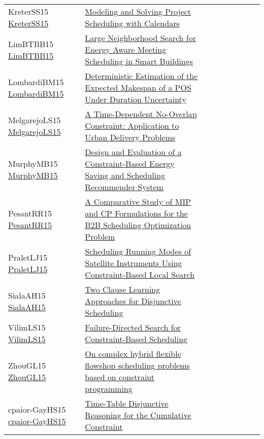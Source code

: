 {\begin{longtable}{p{3cm}p{7cm}lllllll}
KreterSS15 \href{https://doi.org/10.1007/978-3-319-23219-5\_19}{KreterSS15} &  \href{papers/KreterSS15.pdf}{Modeling and Solving Project Scheduling with Calendars} &  &  &  &  &  &  & \\
LimBTBB15 \href{https://doi.org/10.1007/978-3-319-18008-3\_17}{LimBTBB15} &  \href{papers/LimBTBB15.pdf}{Large Neighborhood Search for Energy Aware Meeting Scheduling in Smart Buildings} &  &  &  &  &  &  & \\
LombardiBM15 \href{https://doi.org/10.1007/978-3-319-23219-5\_20}{LombardiBM15} &  \href{papers/LombardiBM15.pdf}{Deterministic Estimation of the Expected Makespan of a {POS} Under Duration Uncertainty} &  &  &  &  &  &  & \\
MelgarejoLS15 \href{https://doi.org/10.1007/978-3-319-18008-3\_1}{MelgarejoLS15} &  \href{papers/MelgarejoLS15.pdf}{A Time-Dependent No-Overlap Constraint: Application to Urban Delivery Problems} &  &  &  &  &  &  & \\
MurphyMB15 \href{https://doi.org/10.1007/978-3-319-23219-5\_47}{MurphyMB15} &  \href{papers/MurphyMB15.pdf}{Design and Evaluation of a Constraint-Based Energy Saving and Scheduling Recommender System} &  &  &  &  &  &  & \\
PesantRR15 \href{https://doi.org/10.1007/978-3-319-18008-3\_21}{PesantRR15} &  \href{papers/PesantRR15.pdf}{A Comparative Study of {MIP} and {CP} Formulations for the {B2B} Scheduling Optimization Problem} &  &  &  &  &  &  & \\
PraletLJ15 \href{https://doi.org/10.1007/978-3-319-23219-5\_48}{PraletLJ15} &  \href{papers/PraletLJ15.pdf}{Scheduling Running Modes of Satellite Instruments Using Constraint-Based Local Search} &  &  &  &  &  &  & \\
SialaAH15 \href{https://doi.org/10.1007/978-3-319-23219-5\_28}{SialaAH15} &  \href{papers/SialaAH15.pdf}{Two Clause Learning Approaches for Disjunctive Scheduling} &  &  &  &  &  &  & \\
VilimLS15 \href{https://doi.org/10.1007/978-3-319-18008-3\_30}{VilimLS15} &  \href{papers/VilimLS15.pdf}{Failure-Directed Search for Constraint-Based Scheduling} &  &  &  &  &  &  & \\
ZhouGL15 \href{https://doi.org/10.1109/FSKD.2015.7382064}{ZhouGL15} &  \href{papers/ZhouGL15.pdf}{On complex hybrid flexible flowshop scheduling problems based on constraint programming} &  &  &  &  &  &  & \\
cpaior-GayHS15 \href{https://doi.org/10.1007/978-3-319-18008-3\_11}{cpaior-GayHS15} &  \href{papers/cpaior-GayHS15.pdf}{Time-Table Disjunctive Reasoning for the Cumulative Constraint} &  &  &  &  &  &  & \\

\end{longtable}}
